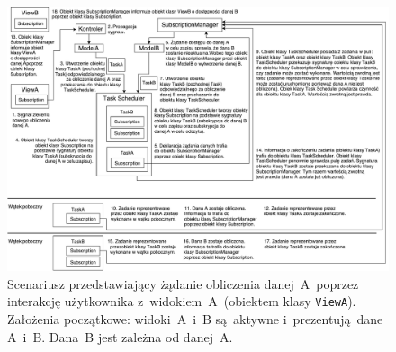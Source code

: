 \begin{landscape}
	\begin{figure}[ht]
		\centering
		\includegraphics[width=0.8\linewidth]{rys05/scenario_3}
		\caption{Scenariusz przedstawiający żądanie obliczenia danej~A~poprzez interakcję użytkownika z~widokiem~A~(obiektem klasy \lstinline$ViewA$). Założenia początkowe: widoki~A~i~B są aktywne i~prezentują dane A~i~B. Dana~B jest zależna od danej~A.}
		\label{fig:scenario3}	
	\end{figure}

\end{landscape}

